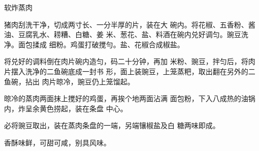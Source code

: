 \begin{recipe}{软炸蒸肉}

\ingredients






\cooking

\step 猪肉刮洗干净，切成两寸长、一分半厚的片，装在大 碗内。将花椒、五香粉、酱油、豆腐乳水、耢糟、白糖、姜 米、葱花、盐、料酒在碗内兑好调匀。豌豆洗净。面包揉成 细粉。鸡蛋打破搅勻。盐、花椒合成椒盐。

\step 将兑好的调料倒在肉片碗内造匀，码二十分钟，再加 米粉、豌豆，拌匀后，将肉片摆入洗净的二鱼碗底成一封书 形，面上装豌豆，上笼蒸粑，取出翻在另外的二鱼碗，拈出 肉片晾冷，豌豆仍上笼馏起。

\step 晾冷的蒸肉两面抹上搅好的鸡蛋，再挨个地两面沾满 面包粉，下入八成热的油锅内，炸呈余黄色捞起，装在条盘 中心。

必将豌豆取出，装在蒸肉条盘的一端，另端镶椒盐及白 糖两味即成。

\notes

香酥味鲜，可甜可咸，别具风味。

\end{recipe}

